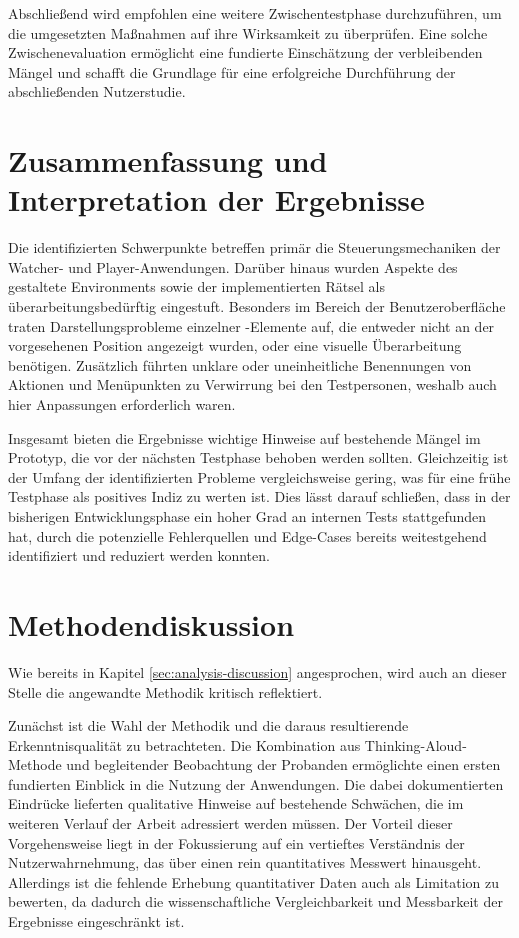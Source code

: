 Abschließend wird empfohlen eine weitere Zwischentestphase durchzuführen, um die umgesetzten Maßnahmen auf ihre Wirksamkeit zu überprüfen. Eine solche Zwischenevaluation ermöglicht eine fundierte Einschätzung der verbleibenden Mängel und schafft die Grundlage für eine erfolgreiche Durchführung der abschließenden Nutzerstudie.

\section{Zusammenfassung und Interpretation der Ergebnisse}

Die identifizierten Schwerpunkte betreffen primär die Steuerungsmechaniken der Watcher- und Player-Anwendungen. Darüber hinaus wurden Aspekte des gestaltete Environments sowie der implementierten Rätsel als überarbeitungsbedürftig eingestuft. Besonders im Bereich der Benutzeroberfläche traten Darstellungsprobleme einzelner -Elemente auf, die entweder nicht an der vorgesehenen Position angezeigt wurden, oder eine visuelle Überarbeitung benötigen. Zusätzlich führten unklare oder uneinheitliche Benennungen von Aktionen und Menüpunkten zu Verwirrung bei den Testpersonen, weshalb auch hier Anpassungen erforderlich waren.

Insgesamt bieten die Ergebnisse wichtige Hinweise auf bestehende Mängel im Prototyp,  die vor der nächsten Testphase behoben werden sollten. Gleichzeitig ist der Umfang der identifizierten Probleme vergleichsweise gering, was für eine frühe Testphase als positives Indiz zu werten ist. Dies lässt darauf schließen, dass in der bisherigen Entwicklungsphase ein hoher Grad an internen Tests stattgefunden hat, durch die potenzielle Fehlerquellen und Edge-Cases bereits weitestgehend identifiziert und reduziert werden konnten.

\section{Methodendiskussion}

Wie bereits in Kapitel \ref{sec:analysis-discussion} angesprochen, wird auch an dieser Stelle die angewandte Methodik kritisch reflektiert.

Zunächst ist die Wahl der Methodik und die daraus resultierende Erkenntnisqualität zu betrachteten. Die Kombination aus Thinking-Aloud-Methode und begleitender Beobachtung der Probanden ermöglichte einen ersten fundierten Einblick in die Nutzung der Anwendungen. Die dabei dokumentierten Eindrücke lieferten qualitative Hinweise auf bestehende Schwächen, die im weiteren Verlauf der Arbeit adressiert werden müssen. Der Vorteil dieser Vorgehensweise liegt in der Fokussierung auf ein vertieftes Verständnis der Nutzerwahrnehmung, das über einen rein quantitatives Messwert hinausgeht. Allerdings ist die fehlende Erhebung quantitativer Daten auch als Limitation zu bewerten, da dadurch die wissenschaftliche Vergleichbarkeit und Messbarkeit der Ergebnisse eingeschränkt ist.

